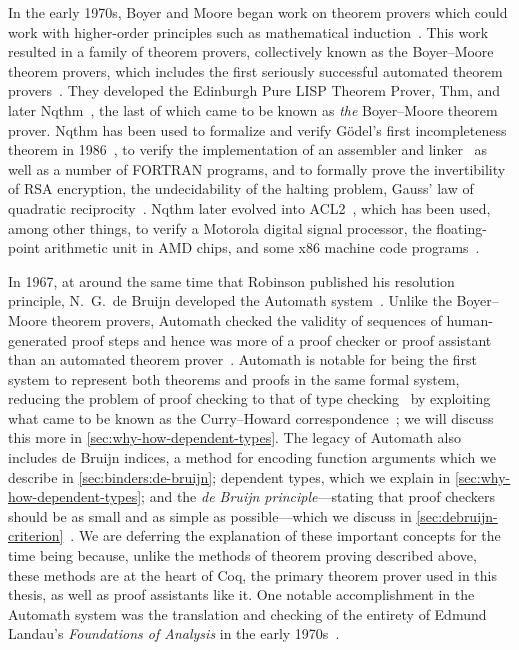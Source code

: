 In the early 1970s, Boyer and Moore began work on theorem provers which could work with higher-order principles such as mathematical induction~\cite[p.~6]{Automation2013Moore}.
This work resulted in a family of theorem provers, collectively known as the Boyer--Moore theorem provers, which includes the first seriously successful automated theorem provers~\cites[p.~8]{Automation2013Moore}{Brief2019Darbari}.
They developed the Edinburgh Pure LISP Theorem Prover, Thm, and later Nqthm~\cites[p.~8]{Automation2013Moore}{Nqthm,wiki:Nqthm}, the last of which came to be known as \emph{the} Boyer--Moore theorem prover.
Nqthm has been used to formalize and verify Gödel's first incompleteness theorem in 1986~\cites{Metamathematics1994Shankar}[p.~29]{Milestones2019Moore}, to verify the implementation of an assembler and linker~\cite{moore2007piton} as well as a number of FORTRAN programs, and to formally prove the invertibility of RSA encryption, the undecidability of the halting problem, Gauss' law of quadratic reciprocity~\cite[pp.~28--29]{Milestones2019Moore}.
Nqthm later evolved into ACL2~\cite{Milestones2019Moore,ACL2Applications,ACL2}, which has been used, among other things, to verify a Motorola digital signal processor, the floating-point arithmetic unit in AMD chips, and some x86 machine code programs~\cite[p.~2]{Milestones2019Moore}.

In 1967, at around the same time that Robinson published his resolution principle, N.~G.~de Bruijn developed the Automath system~\cite{Automath2002Kamareddine,Survey1994deBruijn,mathematical1970Bruijn,wiki:AutoMath}.
Unlike the Boyer--Moore theorem provers, Automath checked the validity of sequences of human-generated proof steps and hence was more of a proof checker or proof assistant than an automated theorem prover~\cite{ringer2020qed}.
Automath is notable for being the first system to represent both theorems and proofs in the same formal system, reducing the problem of proof checking to that of type checking~\cite{ringer2020qed} by exploiting what came to be known as the Curry--Howard correspondence~\cite{Automath2002Kamareddine}; we will discuss this more in \autoref{sec:why-how-dependent-types}.
The legacy of Automath also includes de Bruijn indices, a method for encoding function arguments which we describe in \autoref{sec:binders:de-bruijn}; dependent types, which we explain in \autoref{sec:why-how-dependent-types}; and the \emph{de Bruijn principle}---stating that proof checkers should be as small and as simple as possible---which we discuss in \autoref{sec:debruijn-criterion}~\cite{ringer2020qed,Automath2002Kamareddine}.
We are deferring the explanation of these important concepts for the time being because, unlike the methods of theorem proving described above, these methods are at the heart of Coq, the primary theorem prover used in this thesis, as well as proof assistants like it.
One notable accomplishment in the Automath system was the translation and checking of the entirety of Edmund Landau's \emph{Foundations of Analysis} in the early 1970s~\cite{Automath2002Kamareddine}.

